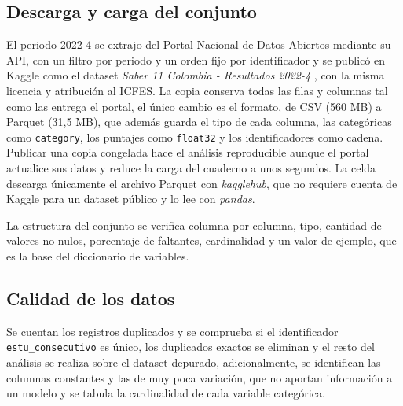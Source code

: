         

    \subsection{Descarga y carga del conjunto}
        El periodo 2022-4 se extrajo del Portal Nacional de Datos Abiertos
        mediante su API, con un filtro por periodo y un orden fijo por
        identificador y se publicó en Kaggle como el dataset \textit{Saber 11
        Colombia - Resultados 2022-4} \cite{rubiano2026kaggle}, con la misma
        licencia y atribución al ICFES. La copia conserva todas las filas y
        columnas tal como las entrega el portal, el único cambio es el formato,
        de CSV (560 MB) a Parquet (31,5 MB), que además guarda el tipo de cada
        columna, las categóricas como \texttt{category}, los puntajes como
        \texttt{float32} y los identificadores como cadena. Publicar una copia
        congelada hace el análisis reproducible aunque el portal actualice sus
        datos y reduce la carga del cuaderno a unos segundos. La celda descarga
        únicamente el archivo Parquet con \textit{kagglehub}, que no requiere
        cuenta de Kaggle para un dataset público y lo lee con \textit{pandas}.

        \vspace{10pt}

        

        \vspace{10pt}

        La estructura del conjunto se verifica columna por columna, tipo,
        cantidad de valores no nulos, porcentaje de faltantes, cardinalidad y 
        un valor de ejemplo, que es la base del diccionario de variables.

        \vspace{10pt}

        

    \subsection{Calidad de los datos}
        Se cuentan los registros duplicados y se comprueba si el identificador
        \texttt{estu\_consecutivo} es único, los duplicados exactos se eliminan 
        y el resto del análisis se realiza sobre el dataset depurado, adicionalmente, 
        se identifican las columnas constantes y las de muy poca variación,
        que no aportan información a un modelo y se tabula la cardinalidad de
        cada variable categórica.

